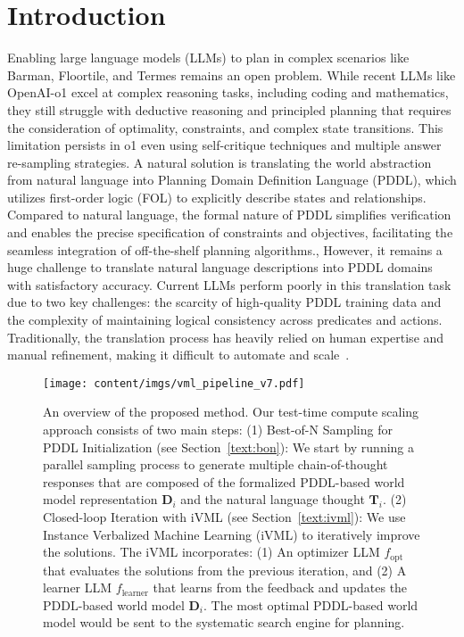 


\section{Introduction}

Enabling large language models (LLMs) to plan in complex scenarios like Barman, Floortile, and Termes remains an open problem. 
While recent LLMs like OpenAI-o1 excel at complex reasoning tasks, including coding and mathematics, they still struggle with deductive reasoning and principled planning that requires the consideration of optimality, constraints, and complex state transitions.
This limitation persists in o1 even using self-critique techniques and multiple answer re-sampling strategies.
A natural solution is translating the world abstraction from natural language into Planning Domain Definition Language (PDDL), which utilizes first-order logic (FOL) to explicitly describe states and relationships. 
Compared to natural language, the formal nature of PDDL simplifies verification and enables the precise specification of constraints and objectives, facilitating the seamless integration of off-the-shelf planning algorithms.,
However, it remains a huge challenge to translate natural language descriptions into PDDL domains with satisfactory accuracy.
Current LLMs perform poorly in this translation task due to two key challenges: the scarcity of high-quality PDDL training data and the complexity of maintaining logical consistency across predicates and actions.
Traditionally, the translation process has heavily relied on human expertise and manual refinement, making it difficult to automate and scale~\cite{guan2023leveraging}.

\begin{figure}[t]
    \centering
    \texttt{[image: content/imgs/vml\_pipeline\_v7.pdf]}
    \vspace{-5mm}
    \caption{\small An overview of the proposed method. Our test-time compute scaling approach consists of two main steps:
    (1) Best-of-N Sampling for PDDL Initialization (see Section~\ref{text:bon}): We start by running a parallel sampling process to generate multiple chain-of-thought responses that are composed of the formalized PDDL-based world model representation $\mathbf{D}_i$ and the natural language thought $\mathbf{T}_i$. 
    (2) Closed-loop Iteration with iVML (see Section~\ref{text:ivml}): We use Instance Verbalized Machine Learning (iVML) to iteratively improve the solutions. 
    The iVML incorporates: (1) An optimizer LLM $f_\mathrm{opt}$ that evaluates the solutions from the previous iteration, and (2) A learner LLM $f_\mathrm{learner}$ that learns from the feedback and updates the PDDL-based world model $\mathbf{D}_i$.
    The most optimal PDDL-based world model would be sent to the systematic search engine for planning.
    }
    \label{fig:pipeline}
\end{figure}


